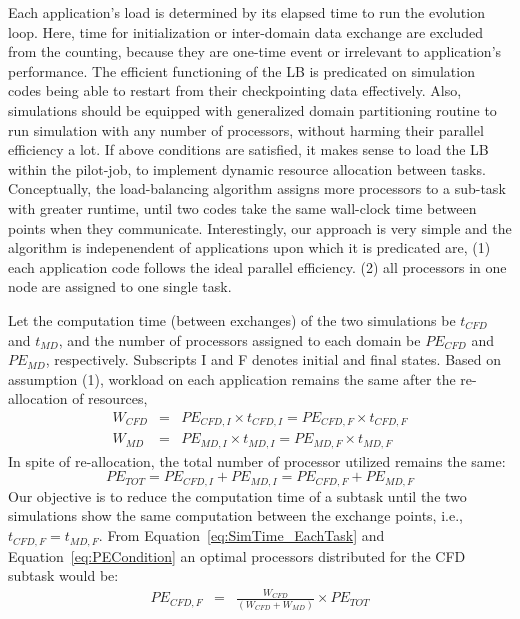 \documentclass[conference,final]{IEEEtran}
\newcommand{\jhanote}[1]{ {\textcolor{red} { ***Jha: #1 }}}
\newcommand{\jhanote}[1]{}
\begin{document}

Each application's load is determined by its elapsed time to run the
evolution loop. Here, time for initialization or inter-domain data
exchange are excluded from the counting, because they are one-time
event or irrelevant to application's performance.  The efficient
functioning of the LB is predicated on simulation codes being able to
restart from their checkpointing data effectively.  Also, simulations
should be equipped with generalized domain partitioning routine to run
simulation with any number of processors, without harming their
parallel efficiency a lot. If above conditions are satisfied, it makes
sense to load the LB within the pilot-job, to implement dynamic
resource allocation between tasks.  Conceptually, the load-balancing
algorithm assigns more processors to a sub-task with greater runtime,
until two codes take the same wall-clock time between points when they
communicate. Interestingly, our approach is very simple and the
algorithm is indepenendent of applications upon which it is predicated
are, (1) each application code follows the ideal parallel efficiency.
(2) all processors in one node are assigned to one single task.

Let the computation time (between exchanges) of the two simulations
be $t_{CFD}$ and $t_{MD}$, and the number of processors assigned to
each domain be $PE_{CFD}$ and $PE_{MD}$, respectively. Subscripts I and F denotes initial and final states. Based on
assumption (1), workload on each application remains the same after
the re-allocation of resources, \begin{eqnarray}
W_{CFD} &=& PE_{CFD,I} \times t_{CFD,I} = PE_{CFD,F} \times t_{CFD,F} \nonumber \\
W_{MD} &=& PE_{MD,I} \times t_{MD,I} = PE_{MD,F} \times t_{MD,F}
\label{eq:SimTime_EachTask}
\end{eqnarray}
In spite
of re-allocation, the total number of processor utilized remains the
same:
\begin{equation}
PE_{TOT} = PE_{CFD,I} + PE_{MD,I} = PE_{CFD,F} + PE_{MD,F}
\label{eq:PECondition}
\end{equation}
Our objective is to reduce the computation time of a subtask until the
two simulations show the same computation between the exchange points, i.e., $t_{CFD,F} = t_{MD,F}$. From
Equation~\ref{eq:SimTime_EachTask} and Equation~\ref{eq:PECondition}
an optimal processors distributed for the CFD subtask would be:
\begin{eqnarray}
PE_{CFD,F} & = & \frac {W_{CFD}} {(W_{CFD} + W_{MD})} \times PE_{TOT}
\end{eqnarray}
\end{document}
